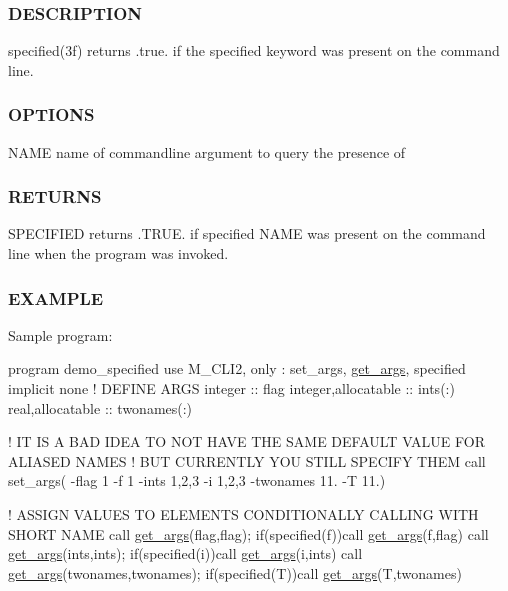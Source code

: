 \subsubsection*{D\+E\+S\+C\+R\+I\+P\+T\+I\+ON}

\begin{DoxyVerb}specified(3f) returns .true. if the specified keyword was present on
the command line.
\end{DoxyVerb}


\subsubsection*{O\+P\+T\+I\+O\+NS}

\begin{DoxyVerb}NAME   name of commandline argument to query the presence of
\end{DoxyVerb}


\subsubsection*{R\+E\+T\+U\+R\+NS}

S\+P\+E\+C\+I\+F\+I\+ED returns .T\+R\+UE. if specified N\+A\+ME was present on the command line when the program was invoked.

\subsubsection*{E\+X\+A\+M\+P\+LE}

Sample program\+:

program demo\+\_\+specified use M\+\_\+\+C\+L\+I2, only \+: set\+\_\+args, \mbox{\hyperlink{interfacem__cli2_1_1get__args}{get\+\_\+args}}, specified implicit none ! D\+E\+F\+I\+NE A\+R\+GS integer \+:\+: flag integer,allocatable \+:\+: ints(\+:) real,allocatable \+:\+: twonames(\+:)

! IT IS A B\+AD I\+D\+EA TO N\+OT H\+A\+VE T\+HE S\+A\+ME D\+E\+F\+A\+U\+LT V\+A\+L\+UE F\+OR A\+L\+I\+A\+S\+ED N\+A\+M\+ES ! B\+UT C\+U\+R\+R\+E\+N\+T\+LY Y\+OU S\+T\+I\+LL S\+P\+E\+C\+I\+FY T\+H\+EM call set\+\_\+args(\textquotesingle{} -\/flag 1 -\/f 1 -\/ints 1,2,3 -\/i 1,2,3 -\/twonames 11. -\/T 11.\textquotesingle{})

! A\+S\+S\+I\+GN V\+A\+L\+U\+ES TO E\+L\+E\+M\+E\+N\+TS C\+O\+N\+D\+I\+T\+I\+O\+N\+A\+L\+LY C\+A\+L\+L\+I\+NG W\+I\+TH S\+H\+O\+RT N\+A\+ME call \mbox{\hyperlink{interfacem__cli2_1_1get__args}{get\+\_\+args}}(\textquotesingle{}flag\textquotesingle{},flag); if(specified(\textquotesingle{}f\textquotesingle{}))call \mbox{\hyperlink{interfacem__cli2_1_1get__args}{get\+\_\+args}}(\textquotesingle{}f\textquotesingle{},flag) call \mbox{\hyperlink{interfacem__cli2_1_1get__args}{get\+\_\+args}}(\textquotesingle{}ints\textquotesingle{},ints); if(specified(\textquotesingle{}i\textquotesingle{}))call \mbox{\hyperlink{interfacem__cli2_1_1get__args}{get\+\_\+args}}(\textquotesingle{}i\textquotesingle{},ints) call \mbox{\hyperlink{interfacem__cli2_1_1get__args}{get\+\_\+args}}(\textquotesingle{}twonames\textquotesingle{},twonames); if(specified(\textquotesingle{}T\textquotesingle{}))call \mbox{\hyperlink{interfacem__cli2_1_1get__args}{get\+\_\+args}}(\textquotesingle{}T\textquotesingle{},twonames)

